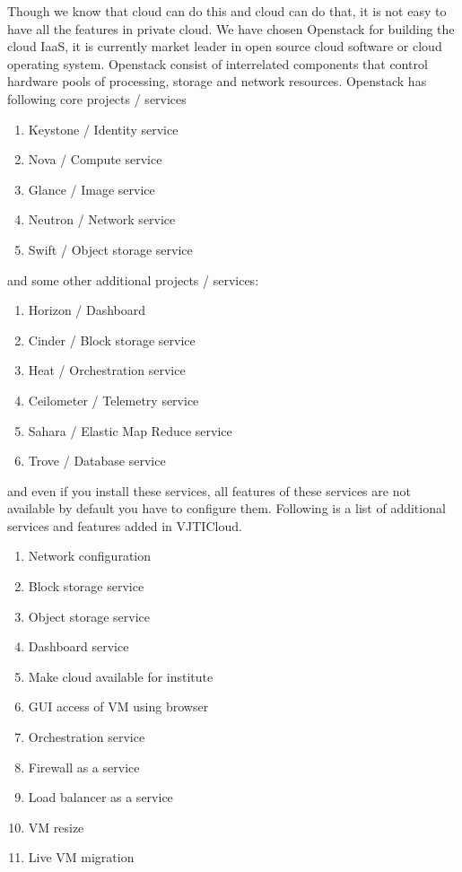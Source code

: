 Though we know that cloud can do this and cloud can do that, it is not easy to have all the features in private cloud. We have chosen Openstack for building the cloud IaaS, it is currently market leader in open source cloud software or cloud operating system. Openstack consist of interrelated components that control hardware pools of processing, storage and network resources\cite{wiki}. Openstack has following core projects / services
\begin{enumerate}
    \item Keystone / Identity service
    \item Nova / Compute service
    \item Glance / Image service
    \item Neutron / Network service
    \item Swift / Object storage service
\end{enumerate}

and some other additional projects / services:
\begin{enumerate}
    \item Horizon / Dashboard
    \item Cinder / Block storage service
    \item Heat / Orchestration service
    \item Ceilometer / Telemetry service
    \item Sahara / Elastic Map Reduce service
    \item Trove / Database service
\end{enumerate}

and even if you install these services, all features of these services are not available by default you have to configure them. Following is a list of additional services and features added in VJTICloud.

\begin{enumerate}
  \item Network configuration
  \item Block storage service
  \item Object storage service
  \item Dashboard service
  \item Make cloud available for institute
  \item GUI access of VM using browser
  \item Orchestration service
  \item Firewall as a service
  \item Load balancer as a service
  \item VM resize 
  \item Live VM migration
\end{enumerate}

